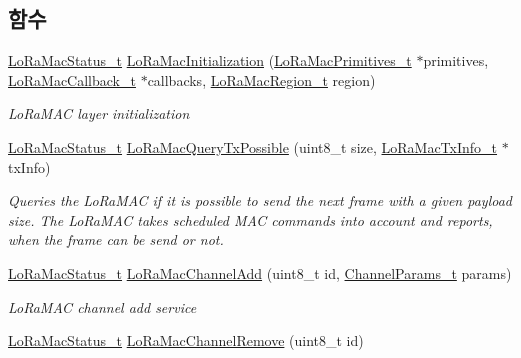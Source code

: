 \subsection*{함수}
\begin{DoxyCompactItemize}
\item 
\mbox{\hyperlink{group___l_o_r_a_m_a_c_ga30bd25657e10480f8605ee951b0ecfbd}{Lo\+Ra\+Mac\+Status\+\_\+t}} \mbox{\hyperlink{group___l_o_r_a_m_a_c_ga7ca445cf825e45999810b3991273eba5}{Lo\+Ra\+Mac\+Initialization}} (\mbox{\hyperlink{group___l_o_r_a_m_a_c_gafc0443f59f49d8597c0accb5e6074c44}{Lo\+Ra\+Mac\+Primitives\+\_\+t}} $\ast$primitives, \mbox{\hyperlink{group___l_o_r_a_m_a_c_ga2899a8ebbefe08452ddf89e14159a160}{Lo\+Ra\+Mac\+Callback\+\_\+t}} $\ast$callbacks, \mbox{\hyperlink{group___l_o_r_a_m_a_c_ga80c48efda9ae02e14b58160d34a798dd}{Lo\+Ra\+Mac\+Region\+\_\+t}} region)
\begin{DoxyCompactList}\small\item\em Lo\+Ra\+M\+AC layer initialization \end{DoxyCompactList}\item 
\mbox{\hyperlink{group___l_o_r_a_m_a_c_ga30bd25657e10480f8605ee951b0ecfbd}{Lo\+Ra\+Mac\+Status\+\_\+t}} \mbox{\hyperlink{group___l_o_r_a_m_a_c_ga8b0aeaf75f9404ce01da9b202252c231}{Lo\+Ra\+Mac\+Query\+Tx\+Possible}} (uint8\+\_\+t size, \mbox{\hyperlink{group___l_o_r_a_m_a_c_ga3219fea2f3c3355f80d2ed29db613683}{Lo\+Ra\+Mac\+Tx\+Info\+\_\+t}} $\ast$tx\+Info)
\begin{DoxyCompactList}\small\item\em Queries the Lo\+Ra\+M\+AC if it is possible to send the next frame with a given payload size. The Lo\+Ra\+M\+AC takes scheduled M\+AC commands into account and reports, when the frame can be send or not. \end{DoxyCompactList}\item 
\mbox{\hyperlink{group___l_o_r_a_m_a_c_ga30bd25657e10480f8605ee951b0ecfbd}{Lo\+Ra\+Mac\+Status\+\_\+t}} \mbox{\hyperlink{group___l_o_r_a_m_a_c_gad74920538f07f34e773ca5de9ec89370}{Lo\+Ra\+Mac\+Channel\+Add}} (uint8\+\_\+t id, \mbox{\hyperlink{group___l_o_r_a_m_a_c_ga1360ca6f82c6d125ea43a9dad9b56184}{Channel\+Params\+\_\+t}} params)
\begin{DoxyCompactList}\small\item\em Lo\+Ra\+M\+AC channel add service \end{DoxyCompactList}\item 
\mbox{\hyperlink{group___l_o_r_a_m_a_c_ga30bd25657e10480f8605ee951b0ecfbd}{Lo\+Ra\+Mac\+Status\+\_\+t}} \mbox{\hyperlink{group___l_o_r_a_m_a_c_gafad6c929a33557ac2fd4000bcacd9453}{Lo\+Ra\+Mac\+Channel\+Remove}} (uint8\+\_\+t id)

\end{DoxyCompactItemize}
